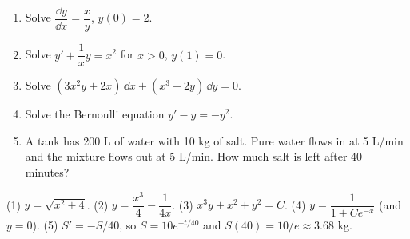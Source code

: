 \begin{practicebox}
\begin{enumerate}
  \item Solve $\dfrac{\dd y}{\dd x} = \dfrac{x}{y}$, \; $y(0)=2$.
  \item Solve $y' + \dfrac{1}{x}y = x^2$ for $x>0$, \; $y(1)=0$.
  \item Solve $(3x^2y + 2x)\,\dd x + (x^3 + 2y)\,\dd y = 0$.
  \item Solve the Bernoulli equation $y' - y = -y^2$.
  \item A tank has 200 L of water with 10 kg of salt. Pure water flows in at 5 L/min and the mixture flows out at 5 L/min. How much salt is left after 40 minutes?
\end{enumerate}
\end{practicebox}

\begin{answerbox}
(1) $y = \sqrt{x^2+4}$. \quad (2) $y = \dfrac{x^3}{4} - \dfrac{1}{4x}$. \quad (3) $x^3y + x^2 + y^2 = C$. \quad (4) $y = \dfrac{1}{1 + Ce^{-x}}$ (and $y=0$). \quad (5) $S' = -S/40$, so $S = 10e^{-t/40}$ and $S(40) = 10/e \approx 3.68$ kg.
\end{answerbox}
